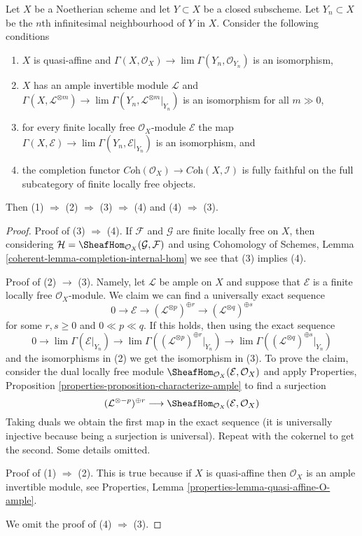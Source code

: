 \begin{lemma}
\label{lemma-completion-fully-faithful}
Let $X$ be a Noetherian scheme and let $Y \subset X$ be a closed subscheme.
Let $Y_n \subset X$ be the $n$th infinitesimal neighbourhood of $Y$ in $X$.
Consider the following conditions
\begin{enumerate}
\item $X$ is quasi-affine and
$\Gamma(X, \mathcal{O}_X) \to \lim \Gamma(Y_n, \mathcal{O}_{Y_n})$
is an isomorphism,
\item $X$ has an ample invertible module $\mathcal{L}$ and
$\Gamma(X, \mathcal{L}^{\otimes m}) \to
\lim \Gamma(Y_n, \mathcal{L}^{\otimes m}|_{Y_n})$
is an isomorphism for all $m \gg 0$,
\item for every finite locally free $\mathcal{O}_X$-module
$\mathcal{E}$ the map
$\Gamma(X, \mathcal{E}) \to \lim \Gamma(Y_n, \mathcal{E}|_{Y_n})$
is an isomorphism, and
\item the completion functor
$\textit{Coh}(\mathcal{O}_X) \to \textit{Coh}(X, \mathcal{I})$
is fully faithful on the full subcategory of finite locally free
objects.
\end{enumerate}
Then (1) $\Rightarrow$ (2) $\Rightarrow$ (3) $\Rightarrow$ (4)
and (4) $\Rightarrow$ (3).
\end{lemma}

\begin{proof}
Proof of (3) $\Rightarrow$ (4). If $\mathcal{F}$ and $\mathcal{G}$
are finite locally free on $X$, then considering
$\mathcal{H} = \SheafHom_{\mathcal{O}_X}(\mathcal{G}, \mathcal{F})$
and using Cohomology of Schemes, Lemma
\ref{coherent-lemma-completion-internal-hom}
we see that (3) implies (4).

\medskip\noindent
Proof of (2) $\rightarrow$ (3). Namely, let $\mathcal{L}$ be ample
on $X$ and suppose that $\mathcal{E}$ is a
finite locally free $\mathcal{O}_X$-module.
We claim we can find a universally exact sequence
$$
0 \to \mathcal{E} \to
(\mathcal{L}^{\otimes p})^{\oplus r} \to
(\mathcal{L}^{\otimes q})^{\oplus s}
$$
for some $r, s \geq 0$ and $0 \ll p \ll q$. If this holds, then
using the exact sequence
$$
0 \to \lim \Gamma(\mathcal{E}|_{Y_n}) \to
\lim \Gamma((\mathcal{L}^{\otimes p})^{\oplus r}|_{Y_n}) \to
\lim \Gamma((\mathcal{L}^{\otimes q})^{\oplus s}|_{Y_n})
$$
and the isomorphisms in (2) we get the isomorphism in (3).
To prove the claim, consider the dual locally free module
$\SheafHom_{\mathcal{O}_X}(\mathcal{E}, \mathcal{O}_X)$
and apply
Properties, Proposition \ref{properties-proposition-characterize-ample}
to find a surjection
$$
(\mathcal{L}^{\otimes -p})^{\oplus r}
\longrightarrow
\SheafHom_{\mathcal{O}_X}(\mathcal{E}, \mathcal{O}_X)
$$
Taking duals we obtain the first map in the exact sequence
(it is universally injective because being a surjection is universal).
Repeat with the cokernel to get the second. Some details omitted.

\medskip\noindent
Proof of (1) $\Rightarrow$ (2). This is true because if $X$ is quasi-affine
then $\mathcal{O}_X$ is an ample invertible module, see
Properties, Lemma \ref{properties-lemma-quasi-affine-O-ample}.

\medskip\noindent
We omit the proof of (4) $\Rightarrow$ (3).
\end{proof}

